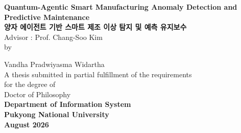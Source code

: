 \begin{titlepage}
    \centering
    {\Large \textbf{Quantum-Agentic Smart Manufacturing Anomaly Detection and Predictive Maintenance}}\\[0.5cm]
    {\Large \textbf{양자 에이전트 기반 스마트 제조 이상 탐지 및 예측 유지보수}}\\[2cm]

    Advisor : Prof. Chang-Soo Kim \\[1cm]

    by
    
    Vandha Pradwiyasma Widartha\\[1cm]
    

    A thesis submitted in partial fulfillment of the requirements \\ 
    for the degree of \\ [0.5cm]
    Doctor of Philosophy \\[1.cm]
    \textbf{Department of Information System }\\
    \textbf{Pukyong National University}\\ [1cm]
    \textbf{August 2026}
\end{titlepage}